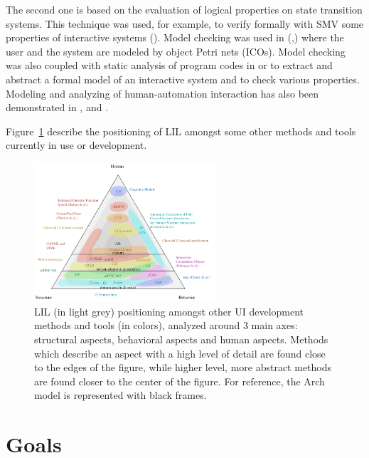 \documentclass{sigchi}
\begin{document}
The second one  is based on the evaluation of  logical properties on  state transition  systems. This  technique was  used, for example, to  verify formally with SMV some properties  of interactive systems    (\cite{Campos97}).    Model    checking    was   used    in (\cite{Palanque95},\cite{Navarre03}) where the user and the system are modeled by object Petri nets (ICOs). Model checking was also coupled  with static analysis of program codes in \cite{ausbourg98}  or \cite{Cortier2008} to extract  and abstract a formal model of an interactive  system and to check various properties. Modeling and analyzing of human-automation  interaction has also been demonstrated in \cite{Rushby01}, \cite{bolton2011} and \cite{combefis2012}.

Figure~\ref{fig:uimethods} describe the positioning of LIL amongst some other methods and tools currently in use or development.

\begin{figure}[!htbp]
\begin{center}
\includegraphics[width=0.6\textwidth]{uimethods.pdf}
\caption{LIL (in light grey) positioning amongst other UI development methods and tools (in colors), analyzed around 3 main axes: structural aspects, behavioral aspects and human aspects. Methods which describe an aspect with a high level of detail are found close to the edges of the figure, while higher level, more abstract methods are found closer to the center of the figure. For reference, the Arch model \protect\cite{Bass91} is represented with black frames.}
\label{fig:uimethods}
\end{center}
\end{figure}

\section{Goals}
\end{document}
